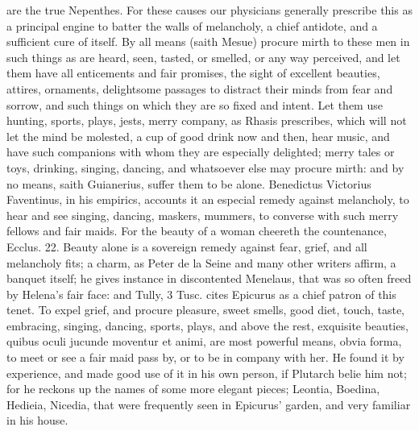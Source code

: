 {are the true Nepenthes. For these causes our physicians generally
prescribe this as a principal engine to batter the walls of melancholy,
a chief antidote, and a sufficient cure of itself. By all means (saith
 Mesue) procure mirth to these men in such things as are heard,
seen, tasted, or smelled, or any way perceived, and let them have all
enticements and fair promises, the sight of excellent beauties,
attires, ornaments, delightsome passages to distract their minds from
fear and sorrow, and such things on which they are so fixed and intent.
Let them use hunting, sports, plays, jests, merry company, as
Rhasis prescribes, which will not let the mind be molested, a cup of
good drink now and then, hear music, and have such companions with whom
they are especially delighted; merry tales or toys, drinking,
singing, dancing, and whatsoever else may procure mirth: and by no
means, saith Guianerius, suffer them to be alone. Benedictus Victorius
Faventinus, in his empirics, accounts it an especial remedy against
melancholy, to hear and see singing, dancing, maskers, mummers,
to converse with such merry fellows and fair maids. For the beauty of a
woman cheereth the countenance, Ecclus.  22.  Beauty alone
is a sovereign remedy against fear, grief, and all melancholy fits; a
charm, as Peter de la Seine and many other writers affirm, a banquet
itself; he gives instance in discontented Menelaus, that was so often
freed by Helena's fair face: and Tully, 3 Tusc. cites Epicurus as
a chief patron of this tenet. To expel grief, and procure pleasure,
sweet smells, good diet, touch, taste, embracing, singing, dancing,
sports, plays, and above the rest, exquisite beauties, quibus oculi
jucunde moventur et animi, are most powerful means, obvia forma, to
meet or see a fair maid pass by, or to be in company with her. He found
it by experience, and made good use of it in his own person, if
Plutarch belie him not; for he reckons up the names of some more
elegant pieces; Leontia, Boedina, Hedieia, Nicedia, that were
frequently seen in Epicurus' garden, and very familiar in his house.

}
